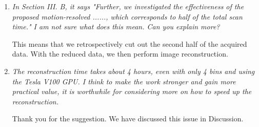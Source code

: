 \documentclass[a4paper,11pt]{report}
\begin{document}
\begin{enumerate}[resume]
	\item \textit{In Section III. B, it says "Further, we investigated the effectiveness of the proposed motion-resolved ......, which corresponds to half of the total scan time." I am not sure what does this mean. Can you explain more?}

\hspace{1em} This means that we retrospectively cut out the second half of the acquired data. 
With the reduced data, we then perform image reconstruction.

	\item \textit{The reconstruction time takes about 4 hours, even with only 4 bins and using the Tesla V100 GPU. I think to make the work stronger and gain more practical value, it is worthwhile for considering more on how to speed up the reconstruction.}

\hspace{1em} Thank you for the suggestion. We have discussed this issue in Discussion.

\end{enumerate}
\end{document}
